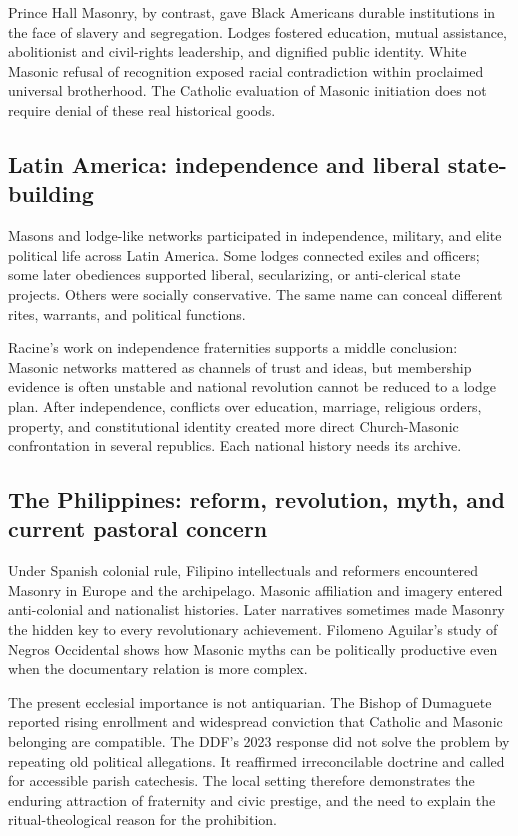 Prince Hall Masonry, by contrast, gave Black Americans durable institutions in the face of slavery and segregation. Lodges fostered education, mutual assistance, abolitionist and civil-rights leadership, and dignified public identity. White Masonic refusal of recognition exposed racial contradiction within proclaimed universal brotherhood. The Catholic evaluation of Masonic initiation does not require denial of these real historical goods.

\subsection{Latin America: independence and liberal state-building}

Masons and lodge-like networks participated in independence, military, and elite political life across Latin America. Some lodges connected exiles and officers; some later obediences supported liberal, secularizing, or anti-clerical state projects. Others were socially conservative. The same name can conceal different rites, warrants, and political functions.

Racine's work on independence fraternities supports a middle conclusion: Masonic networks mattered as channels of trust and ideas, but membership evidence is often unstable and national revolution cannot be reduced to a lodge plan. After independence, conflicts over education, marriage, religious orders, property, and constitutional identity created more direct Church-Masonic confrontation in several republics. Each national history needs its archive.

\subsection{The Philippines: reform, revolution, myth, and current pastoral concern}

Under Spanish colonial rule, Filipino intellectuals and reformers encountered Masonry in Europe and the archipelago. Masonic affiliation and imagery entered anti-colonial and nationalist histories. Later narratives sometimes made Masonry the hidden key to every revolutionary achievement. Filomeno Aguilar's study of Negros Occidental shows how Masonic myths can be politically productive even when the documentary relation is more complex.

The present ecclesial importance is not antiquarian. The Bishop of Dumaguete reported rising enrollment and widespread conviction that Catholic and Masonic belonging are compatible. The DDF's 2023 response did not solve the problem by repeating old political allegations. It reaffirmed irreconcilable doctrine and called for accessible parish catechesis. The local setting therefore demonstrates the enduring attraction of fraternity and civic prestige, and the need to explain the ritual-theological reason for the prohibition.

